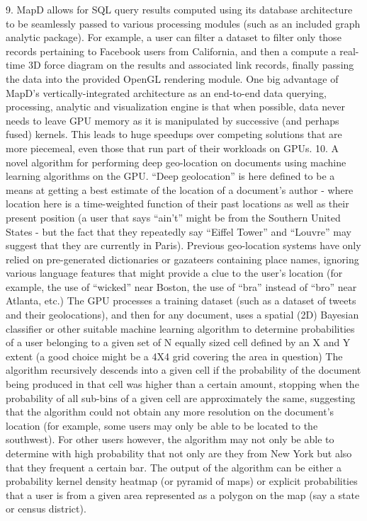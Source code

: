 \documentclass[twocolumn]{article}
\begin{document}
9. MapD allows for SQL query results computed using its database architecture to be seamlessly passed to various processing modules (such as an included graph analytic package). For example, a user can filter a dataset to filter only those records pertaining to Facebook users from California, and then a compute a real-time 3D force diagram on the results and associated link records, finally passing the data into the provided OpenGL rendering module. One big advantage of MapD’s vertically-integrated architecture as an end-to-end data querying, processing, analytic and visualization engine is that when possible, data never needs to leave GPU memory as it is manipulated by successive (and perhaps fused) kernels. This leads to huge speedups over competing solutions that are more piecemeal, even those that run part of their workloads on GPUs.
10. A novel algorithm for performing deep geo-location on documents using machine learning algorithms on the GPU. “Deep geolocation” is here defined to be a means at getting a best estimate of the location of a document’s author - where location here is a time-weighted function of their past locations as well as their present position (a user that says “ain’t” might be from the Southern United States - but the fact that they repeatedly say “Eiffel Tower” and “Louvre” may suggest that they are currently in Paris). Previous geo-location systems have only relied on pre-generated dictionaries or gazateers containing place names, ignoring various language features that might provide a clue to the user’s location (for example, the
use of “wicked” near Boston, the use of “bra” instead of “bro” near Atlanta, etc.) The GPU processes a training dataset (such as a dataset of tweets and their geolocations), and then for any document, uses a spatial (2D) Bayesian classifier or other suitable machine learning algorithm to determine probabilities of a user belonging to a given set of N equally sized cell defined by an X and Y extent (a good choice might be a 4X4 grid covering the area in question) The algorithm recursively descends into a given cell if the probability of the document being produced in that cell was higher than a certain amount, stopping when the probability of all sub-bins of a given cell are approximately the same, suggesting that the algorithm could not obtain any more resolution on the document’s location (for example, some users may only be able to be located to the southwest). For other users however, the algorithm may not only be able to determine with high probability that not only are they from New York but also that they frequent a certain bar. The output of the algorithm can be either a probability kernel density heatmap (or pyramid of maps) or explicit probabilities that a user is from a given area represented as a polygon on the map (say a state or census district).
\end{document}
